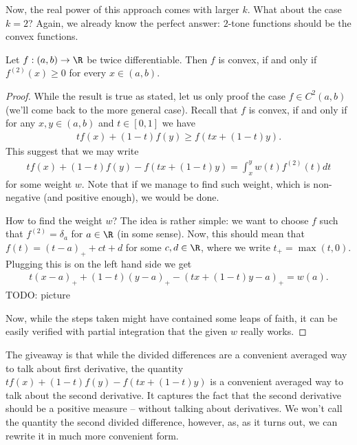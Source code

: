 Now, the real power of this approach comes with larger $k$. What about the case $k = 2$? Again, we already know the perfect answer: $2$-tone functions should be the convex functions.

\begin{lause}
	Let $f : (a, b) \to \R$ be twice differentiable. Then $f$ is convex, if and only if $f^{(2)}(x) \geq 0$ for every $x \in (a, b)$.
\end{lause}

\begin{proof}
	While the result is true as stated, let us only proof the case $f \in C^{2}(a, b)$ (we'll come back to the more general case). Recall that $f$ is convex, if and only if for any $x, y \in (a, b)$ and $t \in [0, 1]$ we have
	\begin{align*}
		t f(x) + (1 - t) f(y) \geq f(t x + (1 - t)y).
	\end{align*}
	This suggest that we may write
	\begin{align*}
		t f(x) + (1 - t) f(y) - f(t x + (1 - t)y) = \int_{x}^{y} w(t) f^{(2)}(t) dt
	\end{align*}
	for some weight $w$. Note that if we manage to find such weight, which is non-negative (and positive enough), we would be done.

	How to find the weight $w$? The idea is rather simple: we want to choose $f$ such that $f^{(2)} = \delta_{a}$ for $a \in \R$ (in some sense). Now, this should mean that $f(t) = (t - a)_{+} + c t + d$ for some $c, d \in \R$, where we write $t_{+} = \max(t, 0)$. Plugging this is on the left hand side we get
	\begin{align*}
		t (x - a)_{+} + (1 - t) (y - a)_{+} - (t x + (1 - t) y - a)_{+} = w(a).
	\end{align*}
	TODO: picture

	Now, while the steps taken might have contained some leaps of faith, it can be easily verified with partial integration that the given $w$ really works.
\end{proof}

The giveaway is that while the divided differences are a convenient averaged way to talk about first derivative, the quantity $tf(x) + (1 - t) f(y) - f(t x + (1 - t)y)$ is a convenient averaged way to talk about the second derivative. It captures the fact that the second derivative should be a positive measure -- without talking about derivatives. We won't call the quantity the second divided difference, however, as, as it turns out, we can rewrite it in much more convenient form.

